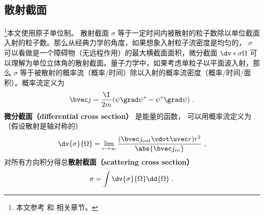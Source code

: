 

\subsection{散射截面}

\footnote{本文参考 \cite{Bransden} 和 \cite{Burke} 相关章节。}本文使用原子单位制。 散射截面 $\sigma$ 等于一定时间内被散射的粒子数除以单位截面入射的粒子数。那么从经典力学的角度，如果想象入射粒子流密度是均匀的， $\sigma$ 可以看做是一个障碍物（无远程作用）的最大横截面面积，微分截面 $\dv*{\sigma}{\Omega}$ 可以理解为单位立体角的散射截面。量子力学中，如果考虑单粒子以平面波入射，那么 $\sigma$ 等于被散射的概率流（概率/时间）除以入射的概率流密度（概率/时间/面积）。概率流定义为
\begin{equation}
\bvec j = \frac{\I }{2m}(\psi \grad \psi^* - \psi^* \grad \psi )~.
\end{equation}
\textbf{微分截面（differential cross section）} 是能量的函数， 可以用概率流定义为（假设散射是轴对称的）
\begin{equation}\label{eq_ParWav_3}
\dv{\sigma}{\Omega} = \lim_{r\to\infty} \frac{(\bvec j_{out} \vdot \uvec r) r^2}{\abs{\bvec j_{in}}}~,
\end{equation}
对所有方向积分得总\textbf{散射截面（scattering cross section）}
\begin{equation}
\sigma = \int \dv{\sigma}{\Omega} \dd{\Omega} ~.
\end{equation}

